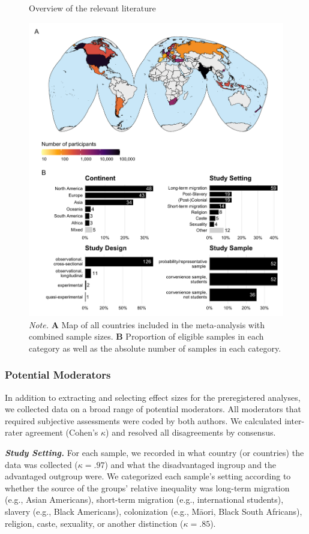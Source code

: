 \documentclass[12pt, letterpaper]{article}
\begin{document}
\begin{figure}
\centering
\caption{Overview of the relevant literature}
\includegraphics[scale=1]{../figures/figure-2}
\caption*{\textit{Note.} \textbf{A} Map of all countries included in the meta-analysis with combined sample sizes. \textbf{B} Proportion of eligible samples in each category as well as the absolute number of samples in each category.}
\label{fig:f2}
\end{figure}

\hypertarget{potential-moderators}{%
\subsubsection{Potential Moderators}\label{potential-moderators}}

In addition to extracting and selecting effect sizes for the
preregistered analyses, we collected data on a broad range of potential
moderators. All moderators that required subjective assessments were
coded by both authors. We calculated inter-rater agreement (Cohen's
\(\kappa\)) and resolved all disagreements by consensus.

\textbf{\emph{Study Setting.}} For each sample, we recorded in what
country (or countries) the data was collected (\(\kappa = .97\)) and
what the disadvantaged ingroup and the advantaged outgroup were. We
categorized each sample's setting according to whether the source of the
groups' relative inequality was long-term migration (e.g., Asian
Americans), short-term migration (e.g., international students), slavery
(e.g., Black Americans), colonization (e.g., Māori, Black South
Africans), religion, caste, sexuality, or another distinction
(\(\kappa = .85\)).
\end{document}

